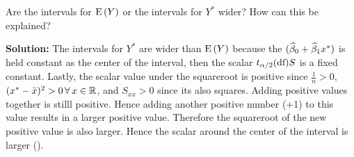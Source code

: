 Are the intervals for $\E{Y}$ or the intervals for $Y^*$ wider? How can this be explained?

\nnl \textbf{Solution: } The intervals for $Y^*$ are wider than $\E{Y}$ because the $(\widehat{\beta}_0 + \widehat{\beta}_1x^*)$ is held constant as the center of the interval, then the scalar $t_{\alpha/2}(\text{df})S$ is a fixed constant. Lastly, the scalar value under the squareroot is positive since $\frac{1}{n} > 0$, $(x^*-\bar{x})^2 > 0 \, \forall \, x \in \mathbb{R}$, and $S_{xx} > 0$ since its also squares.  Adding positive values together is stilll positive. Hence adding another positive number (+1) to this value results in a larger positive value. Therefore the squareroot of the new positive value is also larger. Hence the scalar around the center of the interval is larger ().

